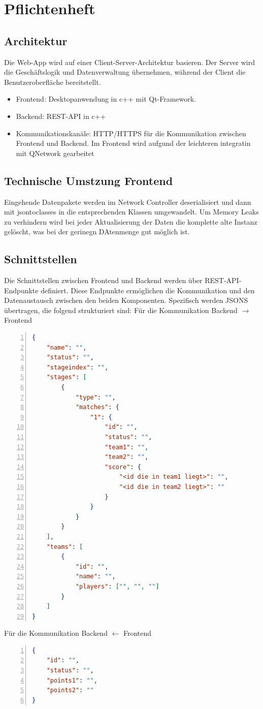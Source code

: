 \section{Pflichtenheft}
\subsection{Architektur}
Die Web-App wird auf einer Client-Server-Architektur basieren. Der Server wird die Geschäftslogik und Datenverwaltung übernehmen, während der Client die Benutzeroberfläche bereitstellt.
\begin{itemize}
    \item Frontend: Desktopanwendung in c++ mit Qt-Framework.
    \item Backend: REST-API in c++ 
    \item Kommunikationskanäle: HTTP/HTTPS für die Kommunikation zwischen Frontend und Backend. Im Frontend wird aufgund der leichteren integratin mit QNetwork gearbeitet
\end{itemize}
\subsection{Technische Umstzung Frontend}
Eingehende Datenpakete werden im Network Controller deserialisiert und dann mit jsontoclasses in die entsprechenden Klassen umgewandelt. Um Memory Leaks zu verhindern wird bei jeder Aktualisierung der Daten die komplette alte Instanz gelöscht, was bei der gerinegn DAtenmenge gut möglich ist.

\subsection{Schnittstellen}
Die Schnittstellen zwischen Frontend und Backend werden über REST-API-Endpunkte definiert. Diese Endpunkte ermöglichen die Kommunikation und den Datenaustausch zwischen den beiden Komponenten. Spezifisch werden JSONS übertragen, die folgend strukturiert sind:
Für die Kommunikation Backend $\rightarrow$ Frontend
\begin{lstlisting}[language=json, firstnumber=1, numbers=left]
    {
    "name": "",
    "status": "",
    "stageindex": "",
    "stages": [
        {
            "type": "",
            "matches": {
                "1": {
                    "id": "",
                    "status": "",
                    "team1": "",
                    "team2": "",
                    "score": {
                        "<id die in team1 liegt>": "",
                        "<id die in team2 liegt>": ""
                    }
                }
            }
        }
    ],
    "teams": [
        {
            "id": "",
            "name": "",
            "players": ["", "", ""]
        }
    ]
}

    \end{lstlisting}

    Für die Kommunikation Backend $\leftarrow$ Frontend
    \begin{lstlisting}[language=json, firstnumber=1, numbers=left]
        {
    "id": "",
    "status": "",
    "points1": "",
    "points2": ""
}

        \end{lstlisting}

